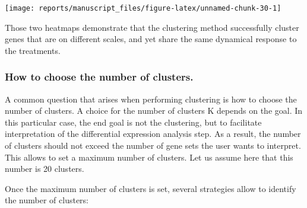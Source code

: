 \documentclass[9pt,a4paper,]{extarticle}
\newenvironment{Shaded}{\begin{snugshade}}{\end{snugshade}}
\newcommand{\CommentTok}[1]{\textcolor[rgb]{0.56,0.35,0.01}{\textit{#1}}}
\newcommand{\DataTypeTok}[1]{\textcolor[rgb]{0.13,0.29,0.53}{#1}}
\newcommand{\DecValTok}[1]{\textcolor[rgb]{0.00,0.00,0.81}{#1}}
\newcommand{\KeywordTok}[1]{\textcolor[rgb]{0.13,0.29,0.53}{\textbf{#1}}}
\newcommand{\NormalTok}[1]{#1}
\newcommand{\OperatorTok}[1]{\textcolor[rgb]{0.81,0.36,0.00}{\textbf{#1}}}
\newcommand{\OtherTok}[1]{\textcolor[rgb]{0.56,0.35,0.01}{#1}}
\newcommand{\StringTok}[1]{\textcolor[rgb]{0.31,0.60,0.02}{#1}}
\begin{document}
\begin{Shaded}
\end{Shaded}

\begin{center}\texttt{[image: reports/manuscript\_files/figure-latex/unnamed-chunk-30-1]} \end{center}

Those two heatmaps demonstrate that the clustering method successfully cluster
genes that are on different scales, and yet share the same dynamical response
to the treatments.

\hypertarget{how-to-choose-the-number-of-clusters.}{%
\subsubsection{How to choose the number of clusters.}\label{how-to-choose-the-number-of-clusters.}}

A common question that arises when performing clustering is how to choose the
number of clusters. A choice for the number of clusters K depends on the goal.
In this particular case, the end goal is not the clustering, but to facilitate
interpretation of the differential expression analysis step. As a result, the
number of clusters should not exceed the number of gene sets the user wants to
interpret. This allows to set a maximum number of clusters. Let us assume here
that this number is 20 clusters.

Once the maximum number of clusters is set, several strategies allow to
identify the number of clusters:
\end{document}
